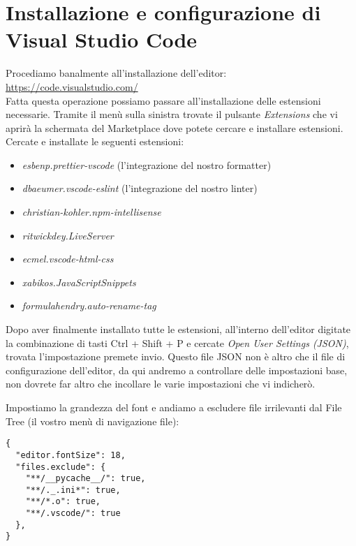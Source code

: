 \section{Installazione e configurazione di Visual Studio Code}
\label{sec3}
Procediamo banalmente all'installazione dell'editor: \url{https://code.visualstudio.com/}\\
Fatta questa operazione possiamo passare all'installazione delle estensioni necessarie. Tramite il menù sulla sinistra trovate il pulsante \textit{Extensions} che vi aprirà la schermata del Marketplace dove potete cercare e installare estensioni. Cercate e installate le seguenti estensioni:
\begin{itemize}
    \item \textit{esbenp.prettier-vscode} (l'integrazione del nostro formatter)
    \item \textit{dbaeumer.vscode-eslint} (l'integrazione del nostro linter)
    \item \textit{christian-kohler.npm-intellisense}
    \item \textit{ritwickdey.LiveServer}
    \item \textit{ecmel.vscode-html-css}
    \item \textit{xabikos.JavaScriptSnippets}
    \item \textit{formulahendry.auto-rename-tag}
\end{itemize}

Dopo aver finalmente installato tutte le estensioni, all'interno dell'editor digitate la combinazione di tasti Ctrl + Shift + P e cercate \textit{Open User Settings (JSON)}, trovata l'impostazione premete invio. Questo file JSON non è altro che il file di configurazione dell'editor, da qui andremo a controllare delle impostazioni base, non dovrete far altro che incollare le varie impostazioni che vi indicherò.

Impostiamo la grandezza del font e andiamo a escludere file irrilevanti dal File Tree (il vostro menù di navigazione file):
\begin{verbatim}
{
  "editor.fontSize": 18,
  "files.exclude": {
    "**/__pycache__/": true,
    "**/._.ini*": true,
    "**/*.o": true,
    "**/.vscode/": true
  },
}
\end{verbatim}

